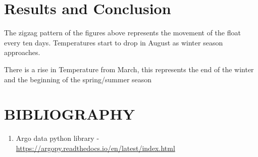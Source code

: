 \documentclass{article}
\begin{document}

\section{Results and Conclusion}
The zigzag pattern of the figures above represents the movement of the float every ten days. Temperatures start to  drop in August as winter season approaches.

There is a rise in Temperature from March, this represents the end of the winter and the beginning of the spring/summer season


\section{BIBLIOGRAPHY}



\begin{enumerate}
\item Argo data python library - \url{ https://argopy.readthedocs.io/en/latest/index.html}
\end{enumerate}

\end{document}
